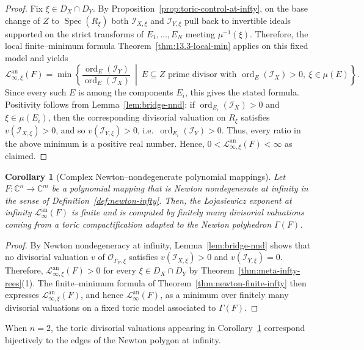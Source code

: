 \documentclass[12pt]{amsart}
\newcommand{\CC}{\mathbb{C}}
\newcommand{\ord}{\operatorname{\mathrm{ord}}}
\newcommand{\cO}{\mathcal{O}}
\newcommand{\Loj}{\mathcal{L}} %
\DeclareMathOperator{\Spec}{Spec}
\theoremstyle{plain}
\newtheorem{corollary}[theorem]{Corollary}
\theoremstyle{definition}
\numberwithin{equation}{section}
\begin{document}
\begin{proof}
	Fix $\xi\in D_X\cap D_Y$. By Proposition~\ref{prop:toric-control-at-infty}, on the base change of $Z$
	to $\Spec(R_\xi)$ both $\mathscr I_{X,\xi}$ and $\mathscr I_{Y,\xi}$ pull back to invertible ideals
	supported on the strict transforms of $E_1,\dots,E_N$ meeting $\mu^{-1}(\xi)$. Therefore, the local
	finite--minimum formula Theorem~\ref{thm:13.3-local-min} applies on this fixed model and yields
	\[
	\Loj^{\text{an}}_{\infty,\xi}(F)
	=
	\min\left\{
	\frac{\ord_E(\mathscr I_Y)}{\ord_E(\mathscr I_X)}
	\ \middle|\
	E \subseteq Z \text{ prime divisor with }\ord_E(\mathscr I_X)>0,\ \xi\in\mu(E)
	\right\}.
	\]
	Since every such $E$ is among the components $E_i$, this gives the stated formula.
	Positivity follows from Lemma~\ref{lem:bridge-nnd}: if $\ord_{E_i}(\mathscr I_X)>0$ and
	$\xi\in\mu(E_i)$, then the corresponding divisorial valuation on $R_\xi$ satisfies
	$v(\mathscr I_{X,\xi})>0$, and so $v(\mathscr I_{Y,\xi})>0$, i.e.\ $\ord_{E_i}(\mathscr I_Y)>0$.
	Thus, every ratio in the above minimum is a positive real number. Hence, $0<\Loj^{\text{an}}_{\infty,\xi}(F)<\infty$ as claimed.
\end{proof}

\begin{corollary}[Complex Newton--nondegenerate polynomial mappings]\label{cor:complex-newton-general}
	Let $F : \CC^n \to \CC^m$ be a polynomial mapping that is Newton nondegenerate at infinity in the sense
	of Definition~\ref{def:newton-infty}. Then, the \L{}ojasiewicz exponent at infinity $\Loj^{\text{an}}_\infty(F)$ is
	finite and is computed by finitely many divisorial valuations coming from a toric compactification
	adapted to the Newton polyhedron $\Gamma(F)$.
\end{corollary}

\begin{proof}
	By Newton nondegeneracy at infinity, Lemma~\ref{lem:bridge-nnd} shows that no divisorial valuation $v$
	of $\cO_{\overline{\Gamma}_F,\xi}$ satisfies $v(\mathscr I_{X,\xi})>0$ and $v(\mathscr I_{Y,\xi})=0$.
	Therefore, $\Loj^{\text{an}}_{\infty,\xi}(F)>0$ for every $\xi\in D_X\cap D_Y$ by
	Theorem~\ref{thm:meta-infty-rees}(1). The finite--minimum formula of
	Theorem~\ref{thm:newton-finite-infty} then expresses $\Loj^{\text{an}}_{\infty,\xi}(F)$, and hence $\Loj^{\text{an}}_\infty(F)$,
	as a minimum over finitely many divisorial valuations on a fixed toric model associated to
	$\Gamma(F)$.
\end{proof}

\smallskip 
When $n=2$, the toric divisorial valuations appearing in Corollary~\ref{cor:complex-newton-general}
correspond bijectively to the edges of the Newton polygon at infinity. 
\end{document}
